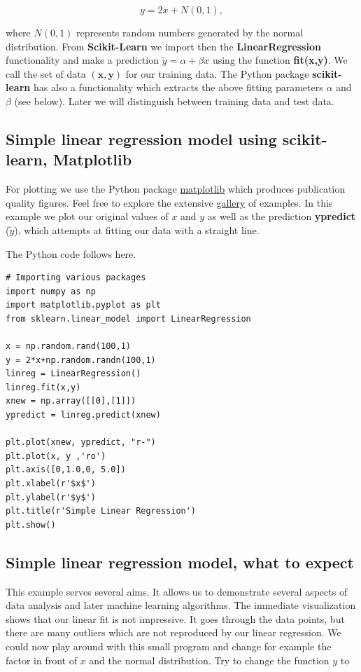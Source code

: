 \documentclass[%
oneside,                 %
final,                   %
10pt]{article}
\begin{document}
\[
y = 2x+N(0,1),
\]

where $N(0,1)$ represents random numbers generated by the normal
distribution.  From \textbf{Scikit-Learn} we import then the
\textbf{LinearRegression} functionality and make a prediction $\tilde{y} =
\alpha + \beta x$ using the function \textbf{fit(x,y)}. We call the set of
data $(\bm{x},\bm{y})$ for our training data. The Python package
\textbf{scikit-learn} has also a functionality which extracts the above
fitting parameters $\alpha$ and $\beta$ (see below). Later we will
distinguish between training data and test data.

\subsection*{Simple linear regression model using \textbf{scikit-learn}, Matplotlib}

For plotting we use the Python package
\href{{https://matplotlib.org/}}{matplotlib} which produces publication
quality figures. Feel free to explore the extensive
\href{{https://matplotlib.org/gallery/index.html}}{gallery} of examples. In
this example we plot our original values of $x$ and $y$ as well as the
prediction \textbf{ypredict} ($\tilde{y}$), which attempts at fitting our
data with a straight line.

The Python code follows here.
\begin{verbatim}
# Importing various packages
import numpy as np
import matplotlib.pyplot as plt
from sklearn.linear_model import LinearRegression

x = np.random.rand(100,1)
y = 2*x+np.random.randn(100,1)
linreg = LinearRegression()
linreg.fit(x,y)
xnew = np.array([[0],[1]])
ypredict = linreg.predict(xnew)

plt.plot(xnew, ypredict, "r-")
plt.plot(x, y ,'ro')
plt.axis([0,1.0,0, 5.0])
plt.xlabel(r'$x$')
plt.ylabel(r'$y$')
plt.title(r'Simple Linear Regression')
plt.show()
\end{verbatim}


\subsection*{Simple linear regression model, what to expect}

This example serves several aims. It allows us to demonstrate several
aspects of data analysis and later machine learning algorithms. The
immediate visualization shows that our linear fit is not
impressive. It goes through the data points, but there are many
outliers which are not reproduced by our linear regression.  We could
now play around with this small program and change for example the
factor in front of $x$ and the normal distribution.  Try to change the
function $y$ to
\end{document}
